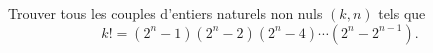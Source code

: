 Trouver tous les couples d'entiers naturels non nuls $(k, n)$ tels que
\[
k! = (2^n - 1)(2^n - 2)(2^n - 4)\cdots(2^n - 2^{n-1}).
\]
